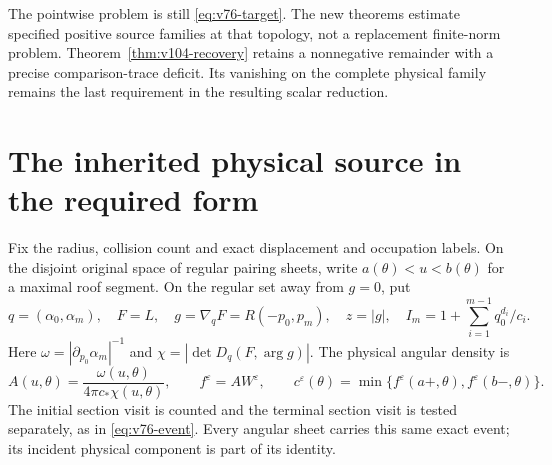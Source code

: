 \documentclass[11pt,reqno]{amsart}
\numberwithin{equation}{section}
\theoremstyle{definition}\newtheorem{definition}[theorem]{Definition}
\theoremstyle{remark}\newtheorem{remark}[theorem]{Remark}
\begin{document}
The pointwise problem is still \eqref{eq:v76-target}. The new
theorems estimate specified positive source families at that topology,
not a replacement finite-norm problem. Theorem~\ref{thm:v104-recovery}
retains a nonnegative remainder with a precise comparison-trace
deficit. Its vanishing on the complete physical family remains the
last requirement in the resulting scalar reduction.

\section{The inherited physical source in the required form}
Fix the radius, collision count and exact displacement and occupation
labels. On the disjoint original space of regular pairing sheets,
write $a(\theta)<u<b(\theta)$ for a maximal roof segment. On the regular set away from $g=0$, put
\[
 q=(\alpha_0,\alpha_m),\quad F=L,\quad
 g=\nabla_qF=R(-p_0,p_m),\quad z=|g|,\quad
 I_m=1+\sum_{i=1}^{m-1}q_0^{d_i}/c_i.
\]
Here $\omega=|\partial_{p_0}\alpha_m|^{-1}$ and
$\chi=|\det D_q(F,\arg g)|$. The physical angular density is
\[
 A(u,\theta)=\frac{\omega(u,\theta)}{4\pi c_*\chi(u,\theta)},
 \qquad f^\varepsilon=A W^\varepsilon,
 \qquad c^\varepsilon(\theta)
     =\min\{f^\varepsilon(a+,\theta),f^\varepsilon(b-,\theta)\}.
\]
The initial section visit is counted and the terminal section visit
is tested separately, as in \eqref{eq:v76-event}. Every angular
sheet carries this same exact event; its incident physical component
is part of its identity.
\end{document}
